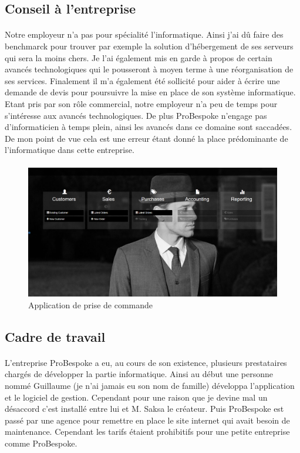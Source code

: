  \subsection{Conseil à l'entreprise}
 \paragraph{}
 Notre employeur n'a pas pour spécialité l'informatique. Ainsi j'ai dû faire des benchmarck pour trouver par exemple la solution d'hébergement de ses serveurs qui sera la moins chers. Je l'ai également mis en garde à propos de certain avancés technologiques qui le pousseront à moyen terme à une réorganisation de ses services. Finalement il m'a également été sollicité pour aider à écrire une demande de devis pour poursuivre la mise en place de son système informatique. Etant pris par son rôle commercial, notre employeur n'a peu de temps pour s'intéresse aux avancés technologiques. De plus ProBespoke n'engage pas d'informaticien à temps plein, ainsi les avancés dans ce domaine sont saccadées. De mon point de vue cela est une erreur étant donné la place prédominante de l'informatique dans cette entreprise.
 \paragraph{}
 \begin{figure}[!h]
 \centering
 \includegraphics[width=16cm]{image/prise.png}
 \caption{Application de prise de commande}
 \end{figure}

  \subsection{Cadre de travail}
  \paragraph{}
L'entreprise ProBespoke a eu, au cours de son existence, plusieurs prestataires chargés de développer la partie informatique. Ainsi au début une personne nommé Guillaume (je n'ai jamais eu son nom de famille) développa l'application et le logiciel de gestion. Cependant pour une raison que je devine mal un désaccord c'est installé entre lui et M. Saksa le créateur. Puis ProBespoke est passé par une agence pour remettre en place le site internet qui avait besoin de maintenance. Cependant les tarifs étaient prohibitifs pour une petite entreprise comme ProBespoke.
